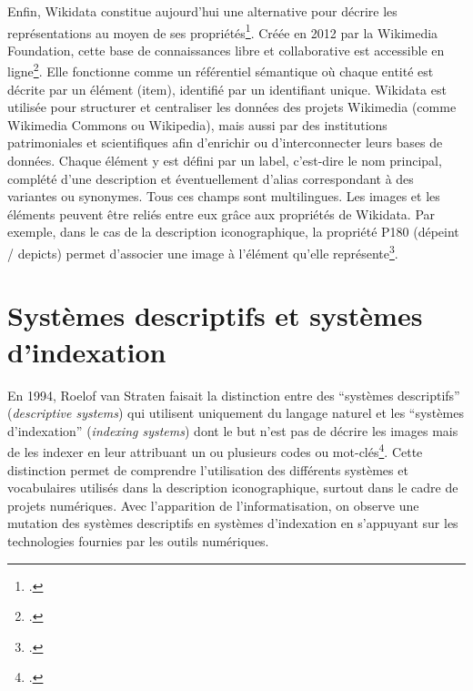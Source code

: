 Enfin, Wikidata constitue aujourd’hui une alternative pour décrire les représentations au moyen de ses propriétés\footcite{Wikidata}. Créée en 2012 par la Wikimedia Foundation, cette base de connaissances libre et collaborative est accessible en ligne\footcite{perezWikipediasNextBig2012}. Elle fonctionne comme un référentiel sémantique où chaque entité est décrite par un élément (item), identifié par un identifiant unique. Wikidata est utilisée pour structurer et centraliser les données des projets Wikimedia (comme Wikimedia Commons ou Wikipedia), mais aussi par des institutions patrimoniales et scientifiques afin d’enrichir ou d’interconnecter leurs bases de données. Chaque élément y est défini par un label, c’est-dire le nom principal, complété d’une description et éventuellement d’alias correspondant à des variantes ou synonymes. Tous ces champs sont multilingues. Les images et les éléments peuvent être reliés entre eux grâce aux propriétés de Wikidata. Par exemple, dans le cas de la description iconographique, la propriété P180 (dépeint / depicts) permet d’associer une image à l’élément qu’elle représente\footcite{P180DepeintDepicts}.

\section{Systèmes descriptifs et systèmes d'indexation}

En 1994, Roelof van Straten faisait la distinction entre des “systèmes descriptifs” (\textit{descriptive systems}) qui utilisent uniquement du langage naturel et les “systèmes d’indexation” (\textit{indexing systems}) dont le but n’est pas de décrire les images mais de les indexer en leur attribuant un ou plusieurs codes ou mot-clés\footcite[p. 101]{vanstratenIconographyIndexingIconclass1994}. Cette distinction permet de comprendre l’utilisation des différents systèmes et vocabulaires utilisés dans la description iconographique, surtout dans le cadre de projets numériques. Avec l’apparition de l’informatisation, on observe une mutation des systèmes descriptifs en systèmes d’indexation en s’appuyant sur les technologies fournies par les outils numériques.

